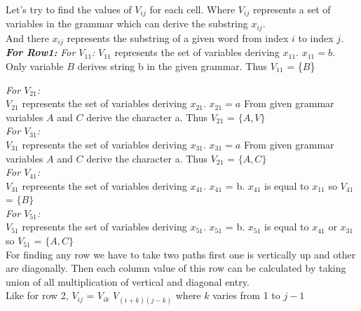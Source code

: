 \documentclass[12pt]{book}
\begin{document}
Let’s try to find the values of $V_{ij}$ for each cell. Where $V_{ij}$ represents a set of variables in the grammar which can derive the substring $x_{ij}$.\\
And there $x_{ij}$ represents the substring of a given word from index $i$ to index $j$.\\

\textbf{\textit{For Row1:}}\newline
\textit{For $V_{11}$:}\newline
$V_{11}$ represents the set of variables deriving $x_{11}$.\newline
$x_{11} = b$.
Only variable $B$ derives string b in the given grammar.\newline
Thus $V_{11}$ = \{$B$\}\newline

\textit{For $V_{21}$:}\\
$V_{21}$ represents the set of variables deriving $x_{21}$.\newline
$x_{21} = a$\newline
From given grammar variables $A$ and $C$ derive the character a.
Thus $V_{21}$ = $\{A, V\}$\\

\textit{For $V_{31}$:}\\
$V_{31}$ represents the set of variables deriving $x_{31}$.\newline
$x_{31} = a$\newline
From given grammar variables $A$ and $C$ derive the character a.
Thus $V_{21}$ = $\{A, C\}$\\

\textit{For $V_{41}$:}\\
$V_{31}$ represents the set of variables deriving $x_{41}$.\newline
$x_{41}$ = b.\newline
$x_{41}$ is equal  to $x_{11}$ so $V_{41}$ = $\{B\}$\\

\textit{For $V_{51}$:}\\
$V_{51}$ represents the set of variables deriving $x_{51}$.\newline
$x_{51}$ = b.
$x_{51}$ is equal to $x_{41}$ or $x_{31}$ so $V_{51}$ = $\{A, C\}$\\

For finding any row we have to take two paths first one is vertically up and other are diagonally. Then each column value of this row can be calculated by taking union of all multiplication of vertical and diagonal entry.\\
Like for row 2,\newline
$V_{ij}$ = $V_{ik}$ $V_{(i+k)(j-k)}$ where $k$ varies from 1 to $j-1$\newline
 
\end{document}
